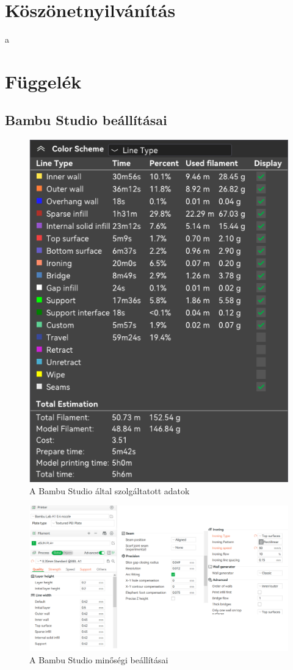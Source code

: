 \documentclass[12pt,a4paper]{article}
\begin{document}
\section{Köszönetnyilvánítás}
a
\pagebreak

\section*{Függelék}
\subsection{Bambu Studio beállításai} \label{sec:slicerbeallitasok}
\begin{figure}[h!]
	\centering
	\includegraphics[width=0.4\linewidth]{fugg_slicer1}
	\caption{A Bambu Studio által szolgáltatott adatok}

\end{figure}

\begin{figure}[h!]
	\centering
	\includegraphics[width=1\linewidth]{fugg_slicer2}
	\caption{A Bambu Studio minőségi beállításai}

\end{figure}
\end{document}
